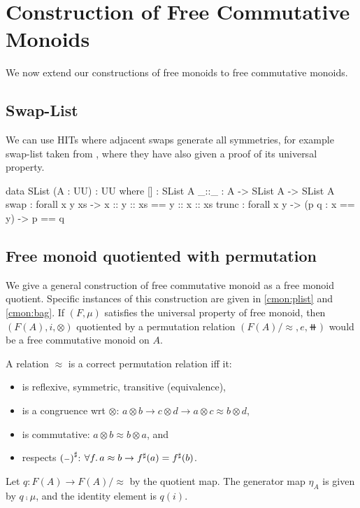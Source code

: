 \section{Construction of Free Commutative Monoids}
\label{sec:commutative-monoids}

We now extend our constructions of free monoids to free commutative monoids.

\subsection{Swap-List}
We can use HITs where adjacent swaps generate all symmetries,
for example swap-list taken from \cite{Choudhury_2023}, where they have
also given a proof of its universal property.

\vspace{1em}
\begin{code}
data SList (A : UU) : UU where
  [] : SList A
  _::_ : A -> SList A -> SList A
  swap : forall x y xs -> x :: y :: xs == y :: x :: xs 
  trunc : forall x y -> (p q : x == y) -> p == q
\end{code}
\vspace{1em}

\subsection{Free monoid quotiented with permutation}
We give a general construction of free commutative monoid as a free monoid quotient.
Specific instances of this construction are given in \ref{cmon:plist} and \ref{cmon:bag}.
If $(F, \mu)$ satisfies the universal property of free monoid,
then $(F(A), i, \otimes)$ quotiented by a permutation relation $(F(A) / \approx, e, \doubleplus)$
would be a free commutative monoid on $A$.

A relation $\approx$ is a correct permutation relation iff it:
\begin{itemize}
    \item is reflexive, symmetric, transitive (equivalence),
    \item is a congruence wrt $\otimes$: $a \otimes b \to c \otimes d \to a \otimes c \approx b \otimes d$,
    \item is commutative: $a \otimes b \approx b \otimes a$, and
    \item respects ${({\scriptstyle{-}})}^{\sharp}$: $\forall f. \, a \approx b \to {f}^{\sharp}(a) = {f}^{\sharp}(b)$.
\end{itemize}

Let $q : F(A) \to F(A) / \approx$ by the quotient map.
The generator map $\eta_A$ is given by $q \comp \mu$, and the identity element is $q(i)$.

